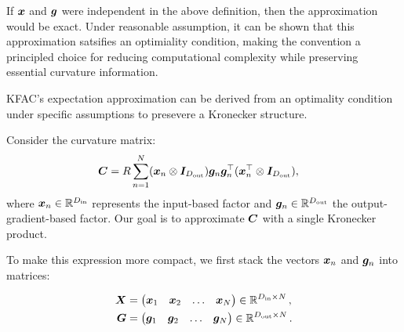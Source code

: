If ${\bm{x}}$ and ${\bm{g}}$ were independent in the above definition, then the approximation would be exact. 
Under reasonable assumption, it can be shown that this approximation satsifies an optimiality condition, making the convention a principled choice for reducing computational complexity while preserving essential curvature information. 

\begin{example}
  \label{ex:just_kfac_exp_approx}
  KFAC's expectation approximation can be derived from an optimality condition under specific assumptions to presevere a Kronecker structure.

  Consider the curvature matrix: 
  \begin{align*}
    {\bm{C}}
    &=
      R \sum_{n=1}^N
      ({\bm{x}}_n \otimes {\bm{I}}_{D_{\text{out}}})
      {\bm{g}}_n {\bm{g}}_n^{\top}
      ({\bm{x}}_n^{\top} \otimes {\bm{I}}_{D_{\text{out}}}),
  \end{align*}
  where ${\bm{x}}_n \in {\mathbb{R}}^{D_{\text{in}}}$ represents the input-based factor and ${\bm{g}}_n \in {\mathbb{R}}^{D_{\text{out}}}$ the output-gradient-based factor. Our goal is to approximate ${\bm{C}}$ with a single Kronecker product.

  To make this expression more compact, we first stack the vectors ${\bm{x}}_n$ and ${\bm{g}}_n$ into matrices:
  
  \begin{align*}
    {\bm{X}}
    &=
      \begin{pmatrix}
        {\bm{x}}_1 & {\bm{x}}_2 & \ldots & {\bm{x}}_N
      \end{pmatrix}
      \in {\mathbb{R}}^{D_{\text{in}} \times N}\,,
    \\
    {\bm{G}}
    &=
      \begin{pmatrix}
        {\bm{g}}_1 & {\bm{g}}_2 & \ldots & {\bm{g}}_N
      \end{pmatrix}
      \in {\mathbb{R}}^{D_{\text{out}} \times N}\,.
  \end{align*}


\end{example}
